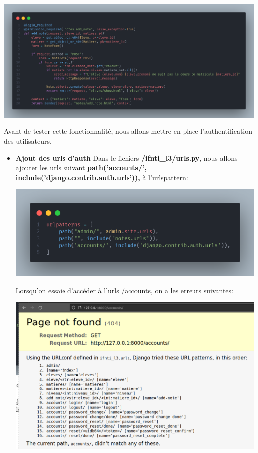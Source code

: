 \documentclass[11pt,a4paper]{article}
\begin{document}
\begin{enumerate}
\begin{center}
\includegraphics[scale=0.2]{images/cont.png}
\end{center}
Avant de tester cette fonctionnalité, nous allons mettre en place l'authentification des utilisateurs.
	\begin{itemize}
		\item \textbf{Ajout des urls d'auth} Dans le fichiers \textbf{/ifnti\_l3/urls.py}, nous allons ajouter les urls suivant \textbf{    path('accounts/', include('django.contrib.auth.urls')),} à l'urlspattern:
			\begin{center}
				\includegraphics[scale=0.2]{images/authurl.png}
			\end{center}
			Lorsqu'on essaie d'accéder à l'urls /accounts, on a les erreurs suivantes:
	\begin{center}
				\includegraphics[scale=0.2]{images/autherr.png}

\end{center}
\end{itemize}
\end{enumerate}
\end{document}
